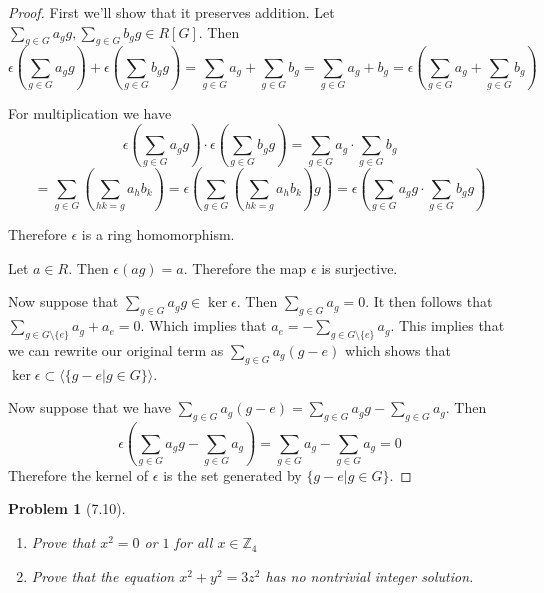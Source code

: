 \documentclass[10pt]{article}
\newcommand{\sk}{\vskip 10mm}
\newcommand{\bb}[1]{\mathbb{#1}}
\theoremstyle{plain}
\newtheorem{problem}{Problem}
\theoremstyle{remark}
\begin{document}
\begin{proof}
  First we'll show that it preserves addition. Let $\sum_{g\in G}a_gg,\sum_{g\in G}b_gg\in R[G]$.
  Then
  \[ \epsilon
    \left(
      \sum_{g\in G}a_gg
    \right)+
    \epsilon
    \left(
      \sum_{g\in G}b_gg
    \right)
    = \sum_{g\in G}a_g+\sum_{g\in G}b_g
    = \sum_{g\in G}a_g+b_g
    = \epsilon
    \left(
      \sum_{g\in G}a_g+\sum_{g\in G}b_g
    \right)\]

  For multiplication we have
  \[
    \epsilon
    \left(
      \sum_{g\in G}a_gg
    \right)\cdot
    \epsilon
    \left(
      \sum_{g\in G}b_gg
    \right)
    =\sum_{g\in G}a_g\cdot\sum_{g\in G}b_g\]\[
    =\sum_{g\in G}
    \left(
      \sum_{hk=g}a_hb_k
    \right)
    =\epsilon
    \left(
      \sum_{g\in G}
      \left(
        \sum_{hk=g}a_hb_k
      \right)g
    \right)
    =\epsilon
    \left(
      \sum_{g\in G}a_gg\cdot\sum_{g\in G}b_gg
    \right)
  \]

  Therefore $\epsilon$ is a ring homomorphism.
  
  Let $a\in R$. Then $\epsilon(ag)=a$. Therefore the map $\epsilon$ is surjective.

  Now suppose that $\sum_{g\in G}a_gg\in \ker \epsilon$. Then $\sum_{g\in G}a_g=0$. It then
  follows that $\sum_{g\in G\setminus\{e\}}a_g+a_e=0$. Which implies that
  $a_e=-\sum_{g\in G\setminus\{e\}}a_g$. This implies that we can rewrite our original
  term as $\sum_{g\in G}a_g(g-e)$ which shows that $\ker \epsilon\subset\langle\{g-e|g\in G\}\rangle$.

  Now suppose that we have $\sum_{g\in G}a_g(g-e)=\sum_{g\in G}a_gg-\sum_{g\in G}a_g$. Then
  \[\epsilon
    \left(
      \sum_{g\in G}a_gg-\sum_{g\in G}a_g
    \right)
    = \sum_{g\in G}a_g-\sum_{g\in G}a_g=0\]
  Therefore the kernel of $\epsilon$ is the set generated by $\{g-e|g\in G\}$.
\end{proof}

\sk

\begin{problem}[7.10]
  \begin{enumerate}
  \item Prove that $x^2=0$ or $1$ for all $x\in\bb{Z}_4$
  \item Prove that the equation $x^2+y^2=3z^2$ has no nontrivial
    integer solution.
  \end{enumerate}
\end{problem}
\end{document}
